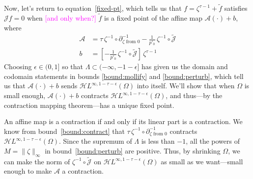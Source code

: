 \documentclass{article}
\newcommand{\holoL}[1]{\mathcal{H}L^{#1}} %
\begin{document}
Now, let's return to equation~\ref{fixed-pt}, which tells us that $f = \zeta^{\tau-1} + \tilde{f}$ satisfies $\mathcal{J}f = 0$ when \textcolor{magenta}{[and only when?]} $\tilde{f}$ is a fixed point of the affine map $\mathcal{A}(\cdot) + b$, where
\begin{align*}
\mathcal{A} & = \tau\,\zeta^{-1} \circ \partial^{-1}_{\zeta \text{ from } 0} - \tfrac{1}{p'_0}\,\zeta^{-1} \circ \tilde{\mathcal{J}}  \\
b & = \left[ -\tfrac{1}{p'_0}\,\zeta^{-1} \circ \tilde{\mathcal{J}} \right]\,\zeta^{\tau-1}
\end{align*}
Choosing $\epsilon \in (0, 1]$ so that $\Lambda \subset (-\infty, -1 - \epsilon]$ has given us the domain and codomain statements in bounds \ref{bound:mollify} and \ref{bound:perturb}, which tell us that $\mathcal{A}(\cdot) + b$ sends $\holoL{\infty, 1-\tau-\epsilon}(\Omega)$ into itself. We'll show that when $\Omega$ is small enough, $\mathcal{A}(\cdot) + b$ contracts $\holoL{\infty, 1-\tau-\epsilon}(\Omega)$, and thus---by the contraction mapping theorem---has a unique fixed point.

An affine map is a contraction if and only if its linear part is a contraction. We know from bound~\ref{bound:contract} that $\tau\,\zeta^{-1} \circ \partial^{-1}_{\zeta \text{ from } 0}$ contracts $\holoL{\infty, 1-\tau-\epsilon}(\Omega)$. Since the supremum of $\Lambda$ is less than $-1$, all the powers of $M = \|\zeta\|_\infty$ in bound~\ref{bound:perturb} are positive. Thus, by shrinking $\Omega$, we can make the norm of $\zeta^{-1} \circ \tilde{\mathcal{J}}$ on $\holoL{\infty, 1-\tau-\epsilon}(\Omega)$ as small as we want---small enough to make $\mathcal{A}$ a contraction.
%



\end{document}
